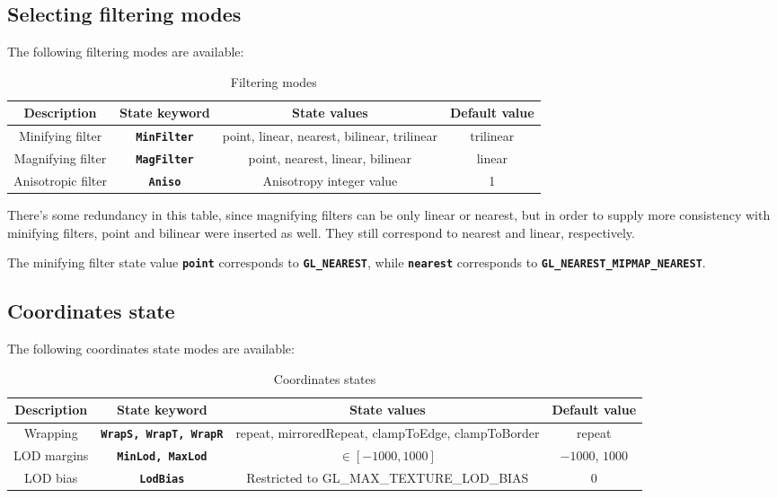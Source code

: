\documentclass[11pt,a4paper,final,titlepage]{article}
\newcommand{\slp}{\left[}
\newcommand{\srp}{\right]}
\begin{document}
\subsection{Selecting filtering modes}
The following filtering modes are available:
\begin{table}[h]
\centering
\begin{tabulary}{\linewidth}{|C|C|C|C|}
\hline
Description & State keyword & State values & Default value\\
\hline\hline
Minifying filter & \texttt{\textbf{MinFilter}} & point, linear, nearest, bilinear, trilinear & trilinear\\
\hline
Magnifying filter & \texttt{\textbf{MagFilter}} & point, nearest, linear, bilinear & linear\\
\hline
Anisotropic filter & \texttt{\textbf{Aniso}} & Anisotropy integer value & 1\\
\hline
\end{tabulary}
\caption{Filtering modes}
\label{tab:filtModes}
\end{table}

There's some redundancy in this table, since magnifying filters can be only linear or nearest,
but in order to supply more consistency with minifying filters, point and bilinear were inserted
as well. They still correspond to nearest and linear, respectively.

The minifying filter state value \texttt{\textbf{point}} corresponds to \texttt{\textbf{GL\_\-NEAREST}},
while \texttt{\textbf{nearest}} corresponds to \texttt{\textbf{GL\_\-NEAREST\_\-MIPMAP\_\-NEAREST}}.

\subsection{Coordinates state}
The following coordinates state modes are available:
\begin{table}[h]
\centering
\begin{tabulary}{\linewidth}{|C|C|C|C|}
\hline
Description & State keyword & State values & Default value\\
\hline\hline
Wrapping & \texttt{\textbf{WrapS, WrapT, WrapR}} &
repeat, mirroredRepeat, clampToEdge, clampToBorder & repeat\\
\hline
LOD margins & \texttt{\textbf{MinLod, MaxLod}} & $\in\slp-1000,1000\srp$ & $-1000$, $1000$\\
\hline
LOD bias & \texttt{\textbf{LodBias}} & Restricted to GL\_MAX\_TEXTURE\_LOD\_BIAS & 0\\
\hline
\end{tabulary}
\caption{Coordinates states}
\label{tab:coordModes}
\end{table}
\end{document}

